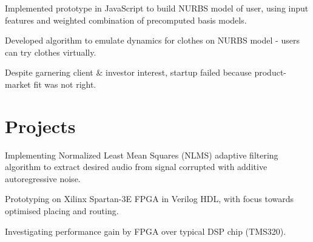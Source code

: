 \documentclass[]{deedy}
\begin{document}
\begin{minipage}[t]{0.69\textwidth}
\begin{flushleft}
\begin{tightemize}
\end{tightemize}
\sectionsep
%
\vspace{1.1pt}
\begin{tightemize}
\item Implemented prototype in JavaScript to build NURBS model of user, using input features and weighted combination of precomputed basis models.
\item Developed algorithm to emulate dynamics for clothes on NURBS model - users can try clothes virtually.
\item Despite garnering client \& investor interest, startup failed because product-market fit was not right.
\end{tightemize}
\sectionsep
\section{Projects}
%
\vspace{1.1pt}
\begin{tightemize}
\item Implementing Normalized Least Mean Squares (NLMS) adaptive filtering algorithm to extract desired audio from signal corrupted with additive autoregressive noise.
\item Prototyping on Xilinx Spartan-3E FPGA in Verilog HDL, with focus towards optimised placing and routing.
\item Investigating performance gain by FPGA over typical DSP chip (TMS320).
\end{tightemize}
\sectionsep
%
\end{flushleft}
\end{minipage}
\end{document}
